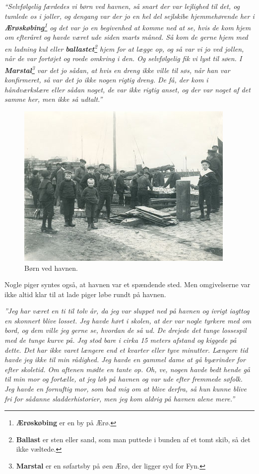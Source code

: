 \emph{``Selvfølgelig færdedes vi børn ved havnen, så snart der var
lejlighed til det, og tumlede os i joller, og dengang var der jo en hel
del sejlskibe hjemmehørende her i \textbf{Ærøskøbing}\footnote{\textbf{Ærøskøbing}
  er en by på Ærø.} og det var jo en begivenhed at komme ned at se, hvis
de kom hjem om efteråret og havde været ude siden marts måned. Så kom de
gerne hjem med en ladning kul eller \textbf{ballastet}\footnote{\textbf{Ballast}
  er sten eller sand, som man puttede i bunden af et tomt skib, så det
  ikke væltede.} hjem for at lægge op, og så var vi jo ved jollen, når
de var fortøjet og roede omkring i den. Og selvfølgelig fik vi lyst til
søen. I \textbf{Marstal}\footnote{\textbf{Marstal} er en søfartsby på
  øen Ærø, der ligger syd for Fyn.} var det jo sådan, at hvis en dreng
ikke ville til søs, når han var konfirmeret, så var det jo ikke nogen
rigtig dreng. De få, der kom i håndværkslære eller sådan noget, de var
ikke rigtig anset, og der var noget af det samme her, men ikke så
udtalt.''}

\begin{figure}
\centering
\includegraphics{images/sejlskibe_tema-1-boern.jpg}
\caption{Børn ved havnen.}
\end{figure}

Nogle piger syntes også, at havnen var et spændende sted. Men
omgivelserne var ikke altid klar til at lade piger løbe rundt på havnen.

\emph{''Jeg har været en ti til tolv år, da jeg var sluppet ned på
havnen og ivrigt iagttog en skonnert blive losset. Jeg havde hørt i
skolen, at der var nogle tyrkere med om bord, og dem ville jeg gerne se,
hvordan de så ud. De drejede det tunge lossespil med de tunge kurve på.
Jeg stod bare i cirka 15 meters afstand og kiggede på dette. Det har
ikke varet længere end et kvarter eller tyve minutter. Længere tid havde
jeg ikke til min rådighed. Jeg havde en gammel dame at gå byærinder for
efter skoletid. Om aftenen mødte en tante op. Oh, ve, nogen havde bedt
hende gå til min mor og fortælle, at jeg løb på havnen og var ude efter
fremmede søfolk. Jeg havde en fornuftig mor, som bad mig om at blive
derfra, så hun kunne blive fri for sådanne sladderhistorier, men jeg kom
aldrig på havnen alene mere.''}

